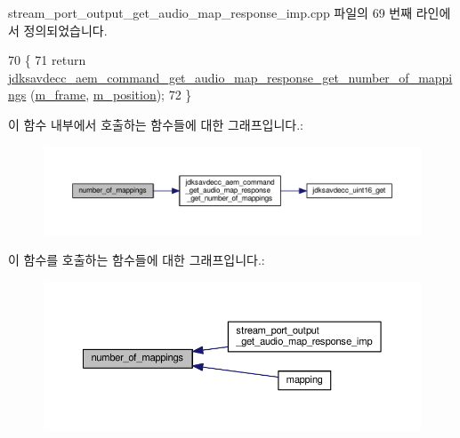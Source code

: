 stream\+\_\+port\+\_\+output\+\_\+get\+\_\+audio\+\_\+map\+\_\+response\+\_\+imp.\+cpp 파일의 69 번째 라인에서 정의되었습니다.


\begin{DoxyCode}
70 \{
71     \textcolor{keywordflow}{return} \hyperlink{group__command__get__audio__map__response_gad2cadbf9180c687c17781f6038a0fe3b}{jdksavdecc\_aem\_command\_get\_audio\_map\_response\_get\_number\_of\_mappings}
      (\hyperlink{classavdecc__lib_1_1stream__port__output__get__audio__map__response__imp_a50417969cf438e7c8d698726bbbe2ff9}{m\_frame}, \hyperlink{classavdecc__lib_1_1stream__port__output__get__audio__map__response__imp_af5e691c4a8a0feb07f48440b321206cd}{m\_position});
72 \}
\end{DoxyCode}


이 함수 내부에서 호출하는 함수들에 대한 그래프입니다.\+:
\nopagebreak
\begin{figure}[H]
\begin{center}
\leavevmode
\includegraphics[width=350pt]{classavdecc__lib_1_1stream__port__output__get__audio__map__response__imp_a3928eb3903b4e082cbc7d6d29146aabd_cgraph}
\end{center}
\end{figure}




이 함수를 호출하는 함수들에 대한 그래프입니다.\+:
\nopagebreak
\begin{figure}[H]
\begin{center}
\leavevmode
\includegraphics[width=350pt]{classavdecc__lib_1_1stream__port__output__get__audio__map__response__imp_a3928eb3903b4e082cbc7d6d29146aabd_icgraph}
\end{center}
\end{figure}




